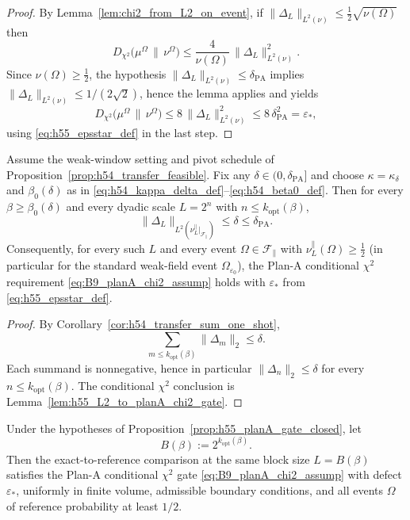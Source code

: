 \begin{proof}
By Lemma~\ref{lem:chi2_from_L2_on_event}, if $\|\Delta_L\|_{L^2(\nu)}\le \frac12\sqrt{\nu(\Omega)}$ then
\[
D_{\chi^2}\!\bigl(\mu^{\Omega}\,\|\,\nu^{\Omega}\bigr)
\le \frac{4}{\nu(\Omega)}\,\|\Delta_L\|_{L^2(\nu)}^2.
\]
Since $\nu(\Omega)\ge \tfrac12$, the hypothesis $\|\Delta_L\|_{L^2(\nu)}\le \delta_{\mathrm{PA}}$ implies
$\|\Delta_L\|_{L^2(\nu)}\le 1/(2\sqrt2)$, hence the lemma applies and yields
\[
D_{\chi^2}\!\bigl(\mu^{\Omega}\,\|\,\nu^{\Omega}\bigr)
\le 8\,\|\Delta_L\|_{L^2(\nu)}^2
\le 8\,\delta_{\mathrm{PA}}^2
=\varepsilon_\ast,
\]
using \eqref{eq:h55_epsstar_def} in the last step.
\end{proof}

\begin{proposition}\label{prop:h55_planA_gate_closed}
Assume the weak-window setting and pivot schedule of Proposition~\ref{prop:h54_transfer_feasible}.
Fix any $\delta\in(0,\delta_{\mathrm{PA}}]$ and choose $\kappa=\kappa_\delta$ and $\beta_0(\delta)$ as in
\eqref{eq:h54_kappa_delta_def}--\eqref{eq:h54_beta0_def}.
Then for every $\beta\ge \beta_0(\delta)$ and every dyadic scale $L=2^n$ with $n\le k_{\mathrm{opt}}(\beta)$,
\[
\|\Delta_L\|_{L^2(\nu_L^{\parallel}|_{\mathscr F_{\parallel}})}\le \delta\le \delta_{\mathrm{PA}}.
\]
Consequently, for every such $L$ and every event $\Omega\in\mathscr F_{\parallel}$ with $\nu_L^{\parallel}(\Omega)\ge \tfrac12$
(in particular for the standard weak-field event $\Omega_{\varepsilon_0}$),
the Plan-A conditional $\chi^2$ requirement \eqref{eq:B9_planA_chi2_assump} holds with $\varepsilon_\ast$ from \eqref{eq:h55_epsstar_def}.
\end{proposition}

\begin{proof}
By Corollary~\ref{cor:h54_transfer_sum_one_shot},
\[
\sum_{m\le k_{\mathrm{opt}}(\beta)}\|\Delta_m\|_2\le \delta.
\]
Each summand is nonnegative, hence in particular $\|\Delta_n\|_2\le \delta$ for every $n\le k_{\mathrm{opt}}(\beta)$.
The conditional $\chi^2$ conclusion is Lemma~\ref{lem:h55_L2_to_planA_chi2_gate}.
\end{proof}

\begin{corollary}\label{cor:h55_planA_gate_one_shot}
Under the hypotheses of Proposition~\ref{prop:h55_planA_gate_closed}, let
\[
B(\beta):=2^{k_{\mathrm{opt}}(\beta)}.
\]
Then the exact-to-reference comparison at the same block size $L=B(\beta)$ satisfies the Plan-A conditional $\chi^2$ gate \eqref{eq:B9_planA_chi2_assump} with defect $\varepsilon_\ast$, uniformly in finite volume, admissible boundary conditions, and all events $\Omega$ of reference probability at least $1/2$.
\end{corollary}

